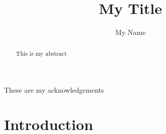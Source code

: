 \documentclass[10pt]{ubthesis}
\title{My Title}
\author{My Name}
\begin{document}
\begin{titlepage}
\maketitle
\end{titlepage}

\begin{ubfrontmatter}
\makecopyright
\cleardoublepage
\begin{acknowledgements}
These are my acknowledgements
\end{acknowledgements}
\tableofcontents
\cleardoublepage
\listoffigures
\cleardoublepage
\listoftables
\cleardoublepage
\begin{abstract}
This is my abstract
\end{abstract}
\end{ubfrontmatter}

\chapter{Introduction}

\begin{ubbackmatter}
\end{ubbackmatter}
\end{document}
